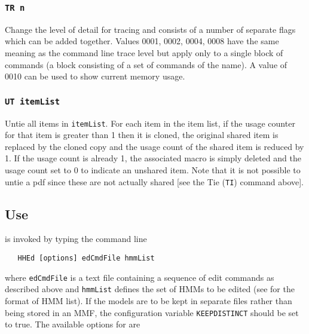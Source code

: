 \subsubsection*{\tt TR n}

Change the level of detail for tracing and consists of a number
of separate flags which can be added together.
Values 0001, 0002, 0004, 0008 have the same meaning as the command
line trace level but apply only to a single block of commands
(a block consisting of a set of commands of the name).
A value of 0010 can be used to show current memory usage.

\subsubsection*{\tt UT itemList}

Untie all items in \texttt{itemList}.  For each item in the item list,
if the usage counter for that item is greater than 1 then it
is cloned, the original shared item is replaced by the cloned copy
and the usage count of the shared item is reduced by 1. 
If the usage count is already 1, the associated macro is simply
deleted and the usage count set to 0 to indicate an unshared item.
Note that it is not possible to untie a pdf since these are not
actually shared [see the Tie (\texttt{TI}) command above].

\subsection{Use}

 is invoked by typing the command line
\begin{verbatim}
   HHEd [options] edCmdFile hmmList
\end{verbatim}
where \texttt{edCmdFile} is a text file containing a sequence of edit commands
as described above and \texttt{hmmList} defines the set of HMMs to be edited
(see  for the format of HMM list). 
If the models are to be kept in separate files rather than being stored in an
MMF, the configuration variable \texttt{KEEPDISTINCT} should be set to true.
The available options for  are

